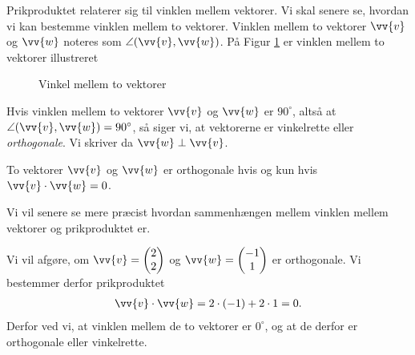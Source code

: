 Prikproduktet relaterer sig til vinklen mellem vektorer. Vi skal senere se, hvordan vi kan bestemme vinklen mellem to vektorer. Vinklen mellem to vektorer $\vv{v}$ og $\vv{w}$ noteres som $\angle(\vv{v},\vv{w})$. På Figur \ref{fig:vinkel} er vinklen mellem to vektorer illustreret
\begin{figure}[H]
	\centering
	\caption{Vinkel mellem to vektorer}
	\label{fig:vinkel}
\end{figure}

Hvis vinklen mellem to vektorer $\vv{v}$ og $\vv{w}$ er $90^\circ$, altså at 
$\angle(\vv{v},\vv{w}) = 90^\circ$, så siger vi, at vektorerne er vinkelrette eller \textit{orthogonale}. Vi skriver da $\vv{w} \perp \vv{v}$.

\begin{setn}\label{setn:1}
To vektorer $\vv{v}$ og $\vv{w}$ er orthogonale hvis og kun hvis $\vv{v}\cdot \vv{w} = 0$.
\end{setn}
Vi vil senere se mere præcist hvordan sammenhængen mellem vinklen mellem vektorer og prikproduktet er. 
\begin{exa}
Vi vil afgøre, om $\vv{v} = \begin{pmatrix}
2\\2
\end{pmatrix}$ og $\vv{w} = \begin{pmatrix}
-1\\1
\end{pmatrix}$ er orthogonale. Vi bestemmer derfor prikproduktet
\begin{align*}
\vv{v}\cdot \vv{w} = 2\cdot(-1)+2\cdot 1 = 0. 
\end{align*}
Derfor ved vi, at vinklen mellem de to vektorer er $0^\circ$, og at de derfor er orthogonale eller vinkelrette.
\end{exa}


